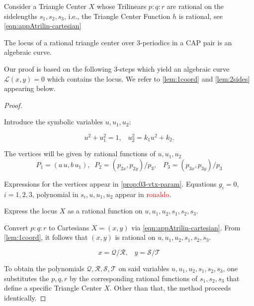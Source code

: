 


Consider a Triangle Center $X$ whose Trilinears $p:q:r$ are rational on the sidelengths $s_1,s_2,s_3$, i.e., the Triangle Center Function $h$ is rational, see  
\cref{eqn:appAtrilin-cartesian}

\begin{theorem}
The locus of a rational triangle center
over 3-periodics in a CAP pair is an algebraic curve.
\label{thm:04-rational-center}
\end{theorem}

Our proof is based on the following 3-steps which yield an algebraic curve $\mathcal{L}(x,y)=0$ which contains the locus. We refer to \cref{lem:1coord} and \cref{lem:2sides} appearing below. %

\begin{proof}

\begin{step}
Introduce the symbolic variables $u, u_1, u_2$:

\begin{equation*}
    u^2 + u_1^2 = 1,\;\;\;   u_2^2 = k_1u^2+k_2.
\end{equation*} %

\end{step}
 
\noindent The vertices will be given by rational functions of   $u, u_1, u_2$ 
\begin{equation*} P_1 = (a\,u, b\,u_1),\;\;P_2 = (p_{2x}, p_{2y})/p_3,\;\;\;P_3 = (p_{3x}, p_{3y})/p_3 
\end{equation*}
 
\noindent Expressions for the vertices appear in \cref{prop:03-vtx-param}. Equations $g_i=0$, $i=1,2,3$, polynomial in $ s_i,u,u_1,u_2$ appear in \textcolor{red}{ronaldo}.
 
\begin{step}Express the locus  $X$ as a  rational function on  $u,u_1, u_2, s_1, s_2, s_3$.
\end{step}

Convert $p:q:r$ to Cartesians $ X = (x,y)$ via  \cref{eqn:appAtrilin-cartesian}. From  \cref{lem:1coord}, it follows that
$\left(x,y\right)$ is rational on $u,u_1,u_2,s_1,s_2,s_3$.

\begin{equation*} x=\mathcal{Q}/\mathcal{R},\;\;\;y=\mathcal{S}/\mathcal{T}
\end{equation*}

\noindent To obtain the polynomials    $\mathcal{Q,R,S,T}$  on said variables $u,u_1,u_2,s_1,s_2,s_3$,
 one substitutes the 
$p,q,r$ by the corresponding rational functions of  $s_1, s_2, s_3$ that define a specific Triangle Center $X$. Other than that, the method proceeds identically.


\end{proof}
